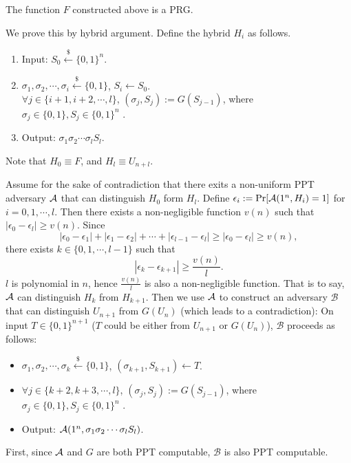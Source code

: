 \begin{theorem}
The function $F$ constructed above is a PRG.
\end{theorem}

\proof
We prove this by hybrid argument. Define the hybrid $H_i$ as follows.
\begin{enumerate}[label=(\alph*)]
	\item Input: $S_0 \xleftarrow{\$} \{0, 1\}^n$.
    \item $\sigma_1, \sigma_2, \cdots, \sigma_i \xleftarrow{\$} \{0, 1\}$, $S_i \gets S_0$.\\
     $\forall j \in \{i+1, i+2, \cdots, l\}$, $(\sigma_j, S_j) := G(S_{j-1})$, where $\sigma_j \in \{0, 1\}, S_j \in \{0, 1\}^n$ .
    \item Output: $\sigma_1 \sigma_2 \cdots \sigma_l S_l$.
\end{enumerate}
Note that $H_0 \equiv F$, and $H_l \equiv U_{n+l}$.

Assume for the sake of contradiction that there exits a non-uniform PPT adversary $\mathcal{A}$ that can distinguish $H_0$ form $H_l$.
Define $\epsilon_i := \Pr[\mathcal{A}(1^n, H_i)=1]$ for $i = 0, 1, \cdots, l$.
Then there exists a non-negligible function $v(n)$ such that $|\epsilon_0 - \epsilon_l| \geq v(n)$.
Since
\[
|\epsilon_0 - \epsilon_1| +
|\epsilon_1 - \epsilon_2| +
\cdots +
|\epsilon_{l-1} - \epsilon_l| \geq
|\epsilon_0 - \epsilon_l|
\geq v(n),
\]
there exists $k \in \{0, 1, \cdots, l-1\}$ such that
\[
|\epsilon_{k} - \epsilon_{k+1}| \geq \frac{v(n)}{l}.
\]
$l$ is polynomial in $n$, hence $\frac{v(n)}{l}$ is also a non-negligible function.
That is to say, $\mathcal{A}$ can distinguish $H_{k}$ from $H_{k+1}$.
Then we use $\mathcal{A}$ to construct an adversary $\mathcal{B}$ that can distinguish $U_{n+1}$ from $G(U_n)$ (which leads to a contradiction):
On input $T \in \{0, 1\}^{n+1}$ ($T$ could be either from $U_{n+1}$ or $G(U_n)$), $\mathcal{B}$ proceeds as follows:
\begin{itemize}
\item $\sigma_1, \sigma_2, \cdots, \sigma_k \xleftarrow{\$} \{0, 1\}$, $(\sigma_{k+1}, S_{k+1}) \gets T$.
\item $\forall j \in \{k+2, k+3, \cdots, l\}$, $(\sigma_j, S_j) := G(S_{j-1})$, where $\sigma_j \in \{0, 1\}, S_j \in \{0, 1\}^n$ .
\item Output: $\mathcal{A}(1^n, \sigma_1 \sigma_2 \cdots \sigma_l S_l)$.
\end{itemize}

First, since $\mathcal{A}$ and $G$ are both PPT computable, $\mathcal{B}$ is also PPT computable.

